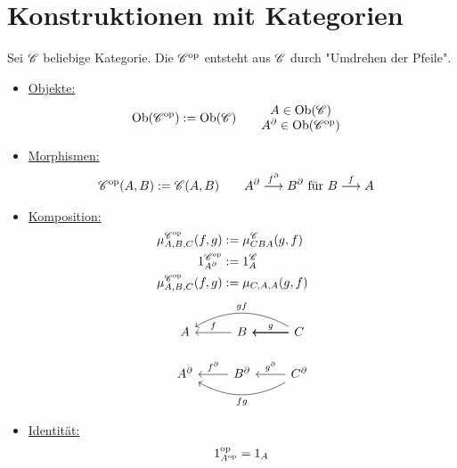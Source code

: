 
\chapter{Konstruktionen mit Kategorien}
\begin{definition}\enter
	Sei $\mathscr C$ beliebige Kategorie.
	Die  $\mathscr C^{\text{op}}$ entsteht aus $\mathscr C$ durch "Umdrehen der Pfeile".
	\begin{itemize}
		\item \ul{Objekte:}
			\begin{align*}
				\operatorname{Ob}(\mathscr C^{\text{op}})&:=\operatorname{Ob}(\mathscr C)\qquad\begin{matrix}
						A\in\operatorname{Ob}(\mathscr C)\\
						A^\partial\in\operatorname{Ob}(\mathscr C^{\text{op}})
						\end{matrix}
			\end{align*}
		\item \ul{Morphismen:}
			\begin{align*}
				\mathscr C^{\text{op}}(A,B)&:=\mathscr C(A,B)\qquad
						A^\partial\overset{f^\partial}{\longrightarrow}B^\partial\text{ für }B\overset{f}{\longrightarrow}A
			\end{align*}
		\item \ul{Komposition:}
			\begin{align*}
				\mu_{A,B,C}^{\mathscr C^{\text{op}}}(f,g)&:=\mu_{CBA}^\mathscr C(g,f)\qquad\\
				1_{A^\partial}^{\mathscr C^{\text{op}}}&:=1_A^\mathscr C\\
				\mu_{A,B,C}^{\mathscr C^{\text{op}}}(f,g) &:= \mu_{C,A,A}(g,f)\\
			\end{align*}
		\begin{align*}
				\begin{tikzcd}[ampersand replacement=\&]
					A \& B \arrow[l, "f"'] \& C \arrow[l, "g"'] \arrow[l] \arrow[l] \arrow[ll, "gf"', bend right]\\
					A^{\partial} \& B^{\partial} \arrow[l, "f^{\partial}"'] \& C^{\partial} \arrow[l, "g^{\partial}"'] \arrow[ll, "fg", bend left]
				\end{tikzcd}
			\end{align*}
		\item \ul{Identität:}
			\begin{align*}
				1_{A^{\text{op}}}^{\text{op}} = 1_A
			\end{align*}
	\end{itemize}
\end{definition}

